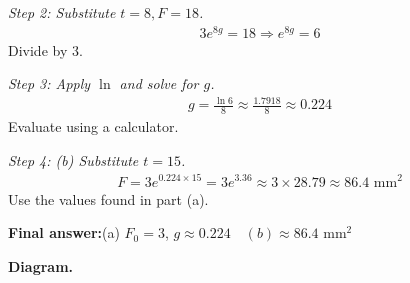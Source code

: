 \documentclass[11pt]{article}
\begin{document}
\textit{Step 2: Substitute \( t = 8, F = 18 \).}
\[\begin{gathered}
3e^{8g} = 18 \Rightarrow e^{8g} = 6
\end{gathered}\]
Divide by 3.

\textit{Step 3: Apply \( \ln \) and solve for \( g \).}
\[\begin{gathered}
g = \frac{\ln 6}{8} \approx \frac{1.7918}{8} \approx 0.224
\end{gathered}\]
Evaluate using a calculator.

\textit{Step 4: (b) Substitute \( t = 15 \).}
\[\begin{gathered}
F = 3e^{0.224 \times 15} = 3e^{3.36} \approx 3 \times 28.79 \approx 86.4 \text{ mm}^2
\end{gathered}\]
Use the values found in part (a).

\begin{answerbox}
\textbf{Final answer:}\quad (a) \(\displaystyle  F_0 = 3 \), \(\displaystyle  g \approx 0.224 \)\(\displaystyle  \quad  (b) \approx 86.4 \text{ mm}^2\)
\end{answerbox}
\textbf{Diagram.}
\end{document}
